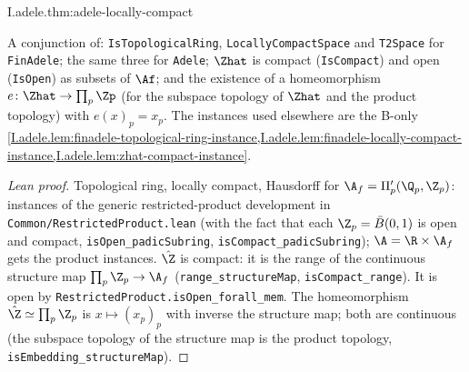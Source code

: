\begin{theorem}
\end{theorem}
\begin{tfformal}{I.adele.thm:adele-locally-compact}
\begin{tffidelity}
A conjunction of: \texttt{IsTopologicalRing}, \texttt{LocallyCompactSpace} and \texttt{T2Space} for \texttt{FinAdele}; the same three for \texttt{Adele}; $\Zhat$ is compact (\texttt{IsCompact}) and open (\texttt{IsOpen}) as subsets of $\Af$; and the existence of a homeomorphism $e\colon\Zhat\to\prod_p\Zp$ (for the subspace topology of $\Zhat$ and the product topology) with $e(x)_p=x_p$. The instances used elsewhere are the B-only \cref{I.adele.lem:finadele-topological-ring-instance,I.adele.lem:finadele-locally-compact-instance,I.adele.lem:zhat-compact-instance}.
\end{tffidelity}
\end{tfformal}
\begin{proof}[Lean proof]
Topological ring, locally compact, Hausdorff for $\A_f=\Pi'_p(\Q_p,\Z_p)$: instances of the generic restricted-product development in \texttt{Common/RestrictedProduct.lean} (with the fact that each $\Z_p=\bar B(0,1)$ is open and compact, \texttt{isOpen\_padicSubring}, \texttt{isCompact\_padicSubring}); $\A=\R\times\A_f$ gets the product instances. $\hat\Z$ is compact: it is the range of the continuous structure map $\prod_p\Z_p\to\A_f$ (\texttt{range\_structureMap}, \texttt{isCompact\_range}). It is open by \texttt{RestrictedProduct.isOpen\_forall\_mem}. The homeomorphism $\hat\Z\simeq\prod_p\Z_p$ is $x\mapsto(x_p)_p$ with inverse the structure map; both are continuous (the subspace topology of the structure map is the product topology, \texttt{isEmbedding\_structureMap}).
\end{proof}


